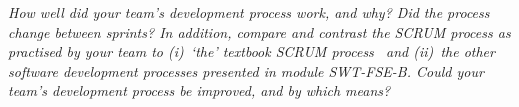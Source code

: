 \emph{How well did your team's development process work, and why? Did the process change between sprints?  In addition, compare and contrast the SCRUM process as practised by your team to (i)~`the' textbook SCRUM process~\cite{scrumbook} and (ii)~the other software development processes presented in module SWT-FSE-B.  Could your team's development process be improved, and by which means?}